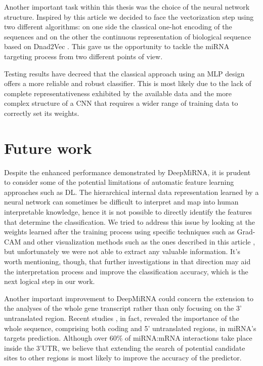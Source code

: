 Another important task within this thesis was the choice of the neural network structure. Inspired by this article \cite{continuous_representation} we decided to face the vectorization step using two different algorithms: on one side the classical one-hot encoding of the sequences and on the other the continuous representation of biological sequence based on Dnad2Vec \cite{dna_distributed_repr}. This gave us the opportunity to tackle the miRNA targeting process from two different points of view.

Testing results have decreed that the classical approach using an MLP design offers a more reliable and robust classifier. This is most likely due to the lack of complete representativeness exhibited by the available data and the more complex structure of a CNN that requires a wider range of training data to correctly set its weights. 

\section{Future work}
Despite the enhanced performance demonstrated by DeepMiRNA, it is prudent to consider
some of the potential limitations of automatic feature learning approaches such as DL. The hierarchical internal data representation learned by a neural network can sometimes be difficult to interpret and map into human interpretable knowledge, hence it is not possible to directly identify the features that determine the classification. We tried to address this issue by looking at the weights learned after the training process using specific techniques such as Grad-CAM \cite{gradcam} and other visualization methods such as the ones described in this article \cite{nlp_visualizing}, but unfortunately we were not able to extract any valuable information. It's worth mentioning, though, that further investigations in that direction may aid the interpretation process and improve the classification accuracy, which is the next logical step in our work.

Another important improvement to DeepMiRNA could concern the extension to the analyses of the whole gene transcript rather than only focusing on the 3' untranslated region. Recent studies \cite{mirwalk} \cite{helwak}, in fact, revealed the importance of the whole sequence, comprising both coding and 5' untranslated regions, in miRNA's targets prediction. Although over 60\% of miRNA:mRNA interactions take place inside the 3'UTR, we believe that extending the search of potential candidate sites to other regions is most likely to improve the accuracy of the predictor. 

